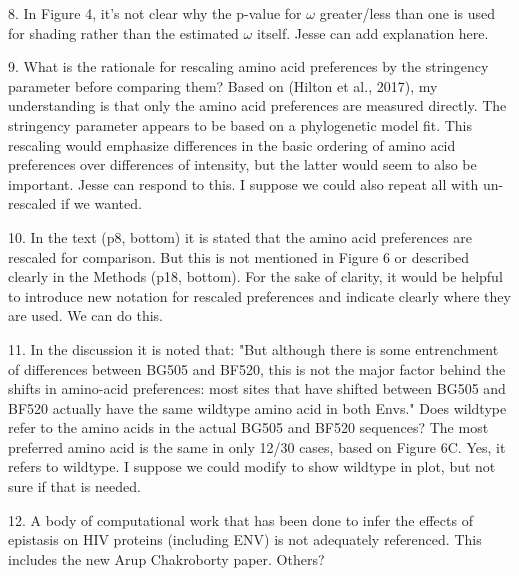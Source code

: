 \documentclass[11pt, oneside]{article}   	%
\begin{document}
8. In Figure 4, it's not clear why the p-value for $\omega$ greater/less than one is used for shading rather than the estimated $\omega$ itself. 
{\color{red}
Jesse can add explanation here.}

9. What is the rationale for rescaling amino acid preferences by the stringency parameter before comparing them? Based on (Hilton et al., 2017), my understanding is that only the amino acid preferences are measured directly. The stringency parameter appears to be based on a phylogenetic model fit. This rescaling would emphasize differences in the basic ordering of amino acid preferences over differences of intensity, but the latter would seem to also be important. 
{\color{red}
Jesse can respond to this. I suppose we could also repeat all with un-rescaled if we wanted.}

10. In the text (p8, bottom) it is stated that the amino acid preferences are rescaled for comparison. But this is not mentioned in Figure 6 or described clearly in the Methods (p18, bottom). For the sake of clarity, it would be helpful to introduce new notation for rescaled preferences and indicate clearly where they are used. 
{\color{red}
We can do this.}

11. In the discussion it is noted that: "But although there is some entrenchment of differences between BG505 and BF520, this is not the major factor behind the shifts in amino-acid preferences: most sites that have shifted between BG505 and BF520 actually have the same wildtype amino acid in both Envs." Does wildtype refer to the amino acids in the actual BG505 and BF520 sequences? The most preferred amino acid is the same in only 12/30 cases, based on Figure 6C. 
{\color{red}
Yes, it refers to wildtype. I suppose we could modify to show wildtype in plot, but not sure if that is needed.}

12. A body of computational work that has been done to infer the effects of epistasis on HIV proteins (including ENV) is not adequately referenced. 
{\color{red}
This includes the new Arup Chakroborty paper. Others?}
\end{document}
